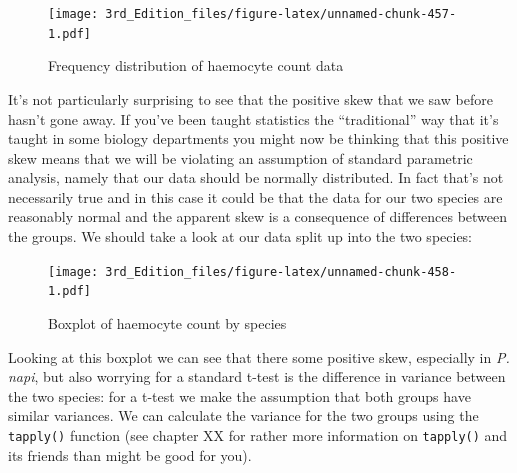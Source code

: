 \documentclass[
]{book}
\newenvironment{Shaded}{\begin{snugshade}}{\end{snugshade}}
\newcommand{\FloatTok}[1]{\textcolor[rgb]{0.00,0.00,0.81}{#1}}
\newcommand{\KeywordTok}[1]{\textcolor[rgb]{0.13,0.29,0.53}{\textbf{#1}}}
\newcommand{\NormalTok}[1]{#1}
\newcommand{\OperatorTok}[1]{\textcolor[rgb]{0.81,0.36,0.00}{\textbf{#1}}}
\newcommand{\StringTok}[1]{\textcolor[rgb]{0.31,0.60,0.02}{#1}}
\begin{document}
\begin{figure}
\centering
\texttt{[image: 3rd\_Edition\_files/figure-latex/unnamed-chunk-457-1.pdf]}
\caption{\label{fig:unnamed-chunk-457}Frequency distribution of haemocyte count data}
\end{figure}

It's not particularly surprising to see that the positive skew that we saw before hasn't gone away. If you've been taught statistics the ``traditional'' way that it's taught in some biology departments you might now be thinking that this positive skew means that we will be violating an assumption of standard parametric analysis, namely that our data should be normally distributed. In fact that's not necessarily true and in this case it could be that the data for our two species are reasonably normal and the apparent skew is a consequence of differences between the groups. We should take a look at our data split up into the two species:

\begin{Shaded}
\end{Shaded}

\begin{figure}
\centering
\texttt{[image: 3rd\_Edition\_files/figure-latex/unnamed-chunk-458-1.pdf]}
\caption{\label{fig:unnamed-chunk-458}Boxplot of haemocyte count by species}
\end{figure}

Looking at this boxplot we can see that there some positive skew, especially in \emph{P. napi}, but also worrying for a standard t-test is the difference in variance between the two species: for a t-test we make the assumption that both groups have similar variances. We can calculate the variance for the two groups using the \texttt{tapply()} function (see chapter XX for rather more information on \texttt{tapply()} and its friends than might be good for you).

\begin{Shaded}
\end{Shaded}
\end{document}
